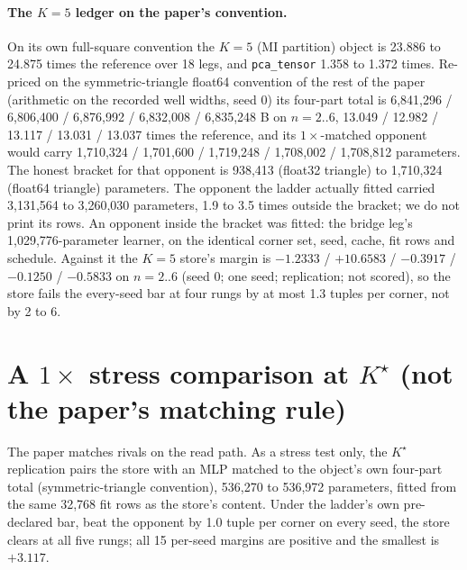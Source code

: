 \documentclass{article}
\newcommand{\Kstar}{\ensuremath{K^{\star}}}
\begin{document}
\paragraph{The $K=5$ ledger on the paper's convention.} On its own full-square convention the
$K=5$ (MI partition) object is 23.886 to 24.875 times the reference over 18 legs, and
\texttt{pca\_tensor} 1.358 to 1.372 times.
Re-priced on the symmetric-triangle float64 convention of the rest of the paper (arithmetic on the
recorded well widths, seed 0) its four-part total is 6,841,296 / 6,806,400 / 6,876,992 / 6,832,008
/ 6,835,248 B on $n=2..6$, 13.049 / 12.982 / 13.117 / 13.031 / 13.037 times the reference, and its
$1\times$-matched opponent would carry 1,710,324 / 1,701,600 / 1,719,248 / 1,708,002 / 1,708,812
parameters.
The honest bracket for that opponent is 938,413 (float32 triangle) to 1,710,324 (float64
triangle) parameters. The opponent the ladder actually fitted carried 3,131,564 to 3,260,030
parameters, 1.9 to 3.5 times outside the bracket; we do not print its rows.
An opponent inside the bracket was fitted: the bridge leg's 1,029,776-parameter learner, on the
identical corner set, seed, cache, fit rows and schedule. Against it the $K=5$ store's margin is
$-1.2333$ / $+10.6583$ / $-0.3917$ / $-0.1250$ / $-0.5833$ on $n=2..6$ (seed 0; one seed;
replication; not scored), so the store fails the every-seed bar at four rungs by at most 1.3 tuples
per corner, not by 2 to 6.

\section{A $1\times$ stress comparison at $\Kstar$ (not the paper's matching rule)}
\label{app:1x}

The paper matches rivals on the read path. As a stress test only, the $\Kstar$ replication pairs the
store with an MLP matched to the object's own four-part total (symmetric-triangle convention),
536,270 to 536,972 parameters, fitted from the same 32,768 fit rows as the store's content.
Under the ladder's own pre-declared bar, beat the opponent by 1.0 tuple per corner on every seed,
the store clears at all five rungs; all 15 per-seed margins are positive and the smallest is
$+3.117$.
\end{document}
